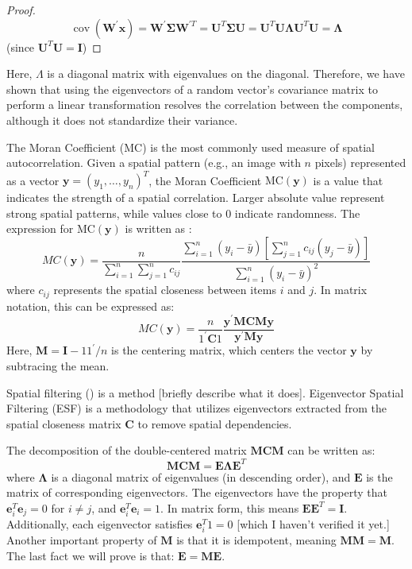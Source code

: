 \documentclass[12pt]{article}
\begin{document}
\begin{proof}
  \[
    \operatorname{cov}\left(\mathbf{W}^{\prime} \mathbf{x}\right)=\mathbf{W}^{\prime} \boldsymbol{\Sigma} \mathbf{W}^{\prime T}=\mathbf{U}^T \boldsymbol{\Sigma} \mathbf{U}=\mathbf{U}^T \mathbf{U} \boldsymbol{\Lambda} \mathbf{U}^T \mathbf{U}=\boldsymbol{\Lambda}
  \]
  (since \( \mathbf{U}^T \mathbf{U}=\mathbf{I} \))
\end{proof}

Here, \( \Lambda \) is a diagonal matrix with eigenvalues on the diagonal. Therefore, we have shown that using the eigenvectors of a random vector's covariance matrix to perform a linear transformation resolves the correlation between the components, although it does not standardize their variance.

The Moran Coefficient (MC) is the most commonly used measure of spatial autocorrelation. Given a spatial pattern (e.g., an image with \( n \) pixels) represented as a vector \( \mathbf{y}=\left(y_1, \ldots, y_n\right)^T \), the Moran Coefficient \( \text{MC} (\mathbf{y}) \) is a value that indicates the strength of a spatial correlation. Larger absolute value represent strong spatial patterns, while values close to 0 indicate randomness. The expression for \( \text{MC} (\mathbf{y}) \) is written as \cite{Griffith_Chun_2014}:
\[
  M C(\mathbf{y})=\frac{n}{\sum_{i=1}^n \sum_{j=1}^n c_{i j}} \frac{\sum_{i=1}^n\left(y_i-\bar{y}\right)\left[\sum_{j=1}^n c_{i j}\left(y_j-\bar{y}\right)\right]}{\sum_{i=1}^n\left(y_i-\bar{y}\right)^2}
\]
where \( c_{ij} \) represents the spatial closeness between items \( i \) and \( j \). In matrix notation, this can be expressed as:
\[
  M C(\mathbf{y})=\frac{n}{1^{\prime} \mathbf{C} 1} \frac{\mathbf{y}^{\prime} \mathbf{M C M y}}{\mathbf{y}^{\prime} \mathbf{My}}
\]
Here, \( \mathbf{M}=\mathbf{I}-11^{\prime} / n \) is the centering matrix, which centers the vector \( \mathbf{y} \) by subtracing the mean.

Spatial filtering (\cite{Tiefelsdorf_Griffith_2007}) is a method [briefly describe what it does]. Eigenvector Spatial Filtering (ESF) is a methodology that utilizes eigenvectors extracted from the spatial closeness matrix \( \mathbf{C} \) to remove spatial dependencies. 

The decomposition of the double-centered matrix \( \mathbf{M C M} \) can be written as:
\[
  \mathbf{M C M}=\mathbf{E} \boldsymbol{\Lambda} \mathbf{E}^{T}
\]
where \( \boldsymbol{\Lambda} \) is a diagonal matrix of eigenvalues (in descending order), and \( \mathbf{E} \) is the matrix of corresponding eigenvectors. The eigenvectors have the property that \( \mathbf{e}_i^T \mathbf{e}_j=0 \) for \( i \neq j \), and \( \mathbf{e}_i^T \mathbf{e}_i=1 \). In matrix form, this means \( \mathbf{E E}^T=\mathbf{I} \). Additionally, each eigenvector satisfies \( \mathbf{e}_i^T 1 = 0 \) [which I haven't verified it yet.] Another important property of \(\mathbf{M}\) is that it is idempotent, meaning \(\mathbf{M M}=\mathbf{M}\). The last fact we will prove is that: \( \mathbf{E}=\mathbf{M E} \).
\end{document}
